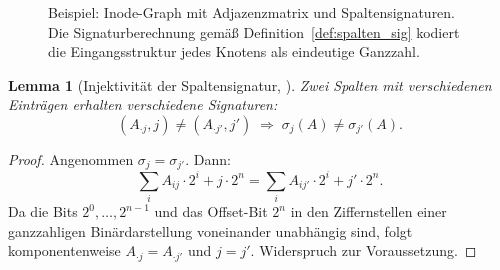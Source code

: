 ﻿\documentclass[a4paper,12pt]{article}
\theoremstyle{definition}
\theoremstyle{plain}
\newtheorem{lemma}{Lemma}[section]
\begin{document}
\begin{figure}[H]
\centering
{}
\caption{Beispiel: Inode-Graph mit Adjazenzmatrix und Spaltensignaturen.
Die Signaturberechnung gemäß Definition~\ref{def:spalten_sig} kodiert
die Eingangsstruktur jedes Knotens als eindeutige Ganzzahl.}
\label{fig:beispiel_sig}
\end{figure}

\begin{lemma}[Injektivität der Spaltensignatur, \cite{dusgraph}]
\label{lem:inj}
  Zwei Spalten mit verschiedenen Einträgen erhalten verschiedene
  Signaturen:
  \[
    (A_{\cdot j}, j) \neq (A_{\cdot j'}, j')
    \;\Longrightarrow\;
    \sigma_j(A) \neq \sigma_{j'}(A).
  \]
\end{lemma}

\begin{proof}
  Angenommen $\sigma_j = \sigma_{j'}$.  Dann:
  \[
    \sum_{i} A_{ij} \cdot 2^i + j \cdot 2^n
    = \sum_{i} A_{ij'} \cdot 2^i + j' \cdot 2^n.
  \]
  Da die Bits $2^0, \ldots, 2^{n-1}$ und das Offset-Bit $2^n$ in den
  Ziffernstellen einer ganzzahligen Binärdarstellung voneinander unabhängig
  sind, folgt komponentenweise $A_{\cdot j} = A_{\cdot j'}$ und $j = j'$.
  Widerspruch zur Voraussetzung. 
\end{proof}
\end{document}
